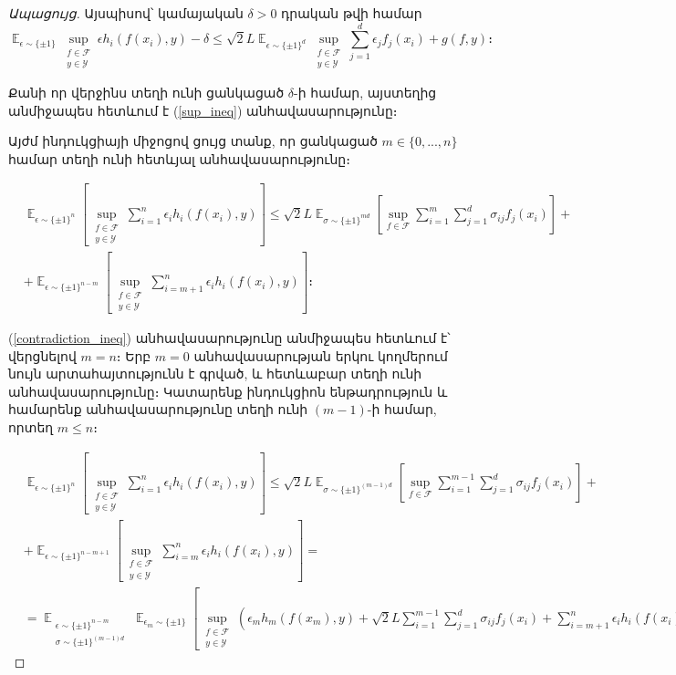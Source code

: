 \documentclass[12pt]{article}
\DeclareMathOperator*{\E}{\mathbb{E}}
\begin{document}
\begin{proof}[Ապացույց]
Այսպիսով՝ կամայական $\delta > 0$ դրական թվի համար
$$\E_{\epsilon \sim \{\pm1\}}\sup_{\substack{f \in \mathcal{F} \\ y \in \mathcal{Y}}}    {\epsilon h_i(f(x_i), y)} - \delta  \leq {\sqrt{2}L} \E_{\epsilon \sim \{\pm 1\}^d}        \sup_{\substack{f \in \mathcal{F}  \\ y \in \mathcal{Y}  }}     \sum_{j=1}^d \epsilon_j f_j(x_i)    +   g(f, y)   ։$$

Քանի որ վերջինս տեղի ունի ցանկացած  $\delta$-ի համար, այստեղից անմիջապես հետևում է (\ref{sup_ineq}) անհավասարությունը։

\par Այժմ ինդուկցիայի միջոցով ցույց տանք,
որ  ցանկացած $m \in \{0, ..., n\}$ համար տեղի ունի հետևյալ անհավասարությունը։

\begin{align*}
&\E_{\epsilon \sim \{\pm 1\}^n}\left[\sup_{\substack{f \in \mathcal{F} \\ y \in \mathcal{Y}} }  \sum_{i=1}^n{\epsilon_ih_i(f(x_i), y)}  \right]    \leq \sqrt{2}L \E_{\sigma \sim \{\pm1\}^{md}} \left[  \sup_{f \in \mathcal{F}}  \sum_{i=1}^m\sum_{j=1}^d{\sigma_{ij}f_j(x_i)}   \right] +\\ &+\E_{\epsilon \sim \{\pm 1\}^{n-m}}\left[\sup_{\substack{f \in \mathcal{F} \\ y \in \mathcal{Y}} }  \sum_{i=m+1}^n{\epsilon_ih_i(f(x_i), y)}  \right]   ։
\end{align*}

(\ref{contradiction_ineq}) անհավասարությունը անմիջապես հետևում է՝ վերցնելով $m = n$։ Երբ $m=0$ անհավասարության երկու կողմերում նույն արտահայտությունն է գրված, և հետևաբար տեղի ունի անհավասարությունը։ Կատարենք ինդուկցիոն ենթադրություն և համարենք անհավասարությունը տեղի ունի $(m-1)$-ի համար, որտեղ $m \leq n$։



\begin{align*}
&\E_{\epsilon \sim \{\pm 1\}^n}\left[\sup_{\substack{f \in \mathcal{F} \\ y \in \mathcal{Y}} }  \sum_{i=1}^n{\epsilon_ih_i(f(x_i), y)}  \right]   
 \leq \sqrt{2}L \E_{\sigma \sim \{\pm1\}^{(m-1)d}} \left[  \sup_{f \in \mathcal{F}}  \sum_{i=1}^{m-1}\sum_{j=1}^d{\sigma_{ij}f_j(x_i)}   \right] +\\ 
 &+\E_{\epsilon \sim \{\pm 1\}^{n-m+1}}\left[\sup_{\substack{f \in \mathcal{F} \\ y \in \mathcal{Y}} }  \sum_{i=m}^n{\epsilon_ih_i(f(x_i), y)}  \right] = \\  
 &= \E_{\substack{\epsilon \sim \{ \pm 1\}^{n-m}   \\ \sigma \sim \{ \pm 1\}^{(m-1)d} }}     \E_{\epsilon_m \sim \{ \pm1 \}} \left [          \sup_{\substack{f \in \mathcal{F} \\ y \in \mathcal{Y}}}     \left(\epsilon_m h_m(f(x_m), y)   +   \sqrt{2}L 				 \sum_{i=1}^{m-1}\sum_{j=1}^d{\sigma_{ij}f_j(x_i)}  + \sum_{i = m+1}^n \epsilon_ih_i(f(x_i), y)				\right )	\right ]։
\end{align*}



\end{proof}
\end{document}
